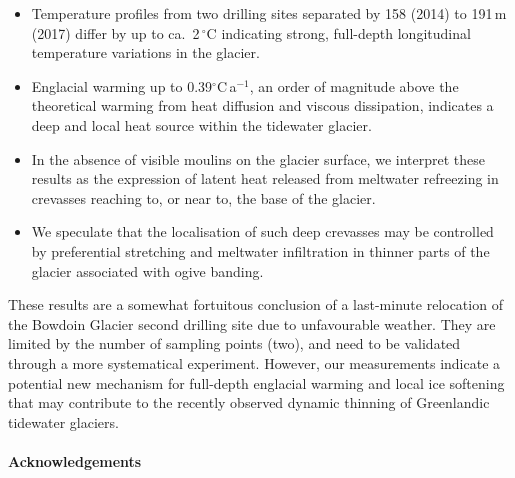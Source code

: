 \documentclass[utf8]{article}
\begin{document}
    \begin{itemize}

      \item Temperature profiles from two drilling sites separated by 158
        (2014) to 191\,m (2017) differ by up to ca.~2\,$^\circ$C indicating
        strong, full-depth longitudinal temperature variations in the glacier.

      \item Englacial warming up to 0.39$^\circ$C\,a$^{-1}$, an order of
        magnitude above the theoretical warming from heat diffusion and viscous
        dissipation, indicates a deep and local heat source within the
        tidewater glacier.

      \item In the absence of visible moulins on the glacier surface, we interpret
        these results as the expression of latent heat released from meltwater
        refreezing in crevasses reaching to, or near to, the base of the glacier.

      \item We speculate that the localisation of such deep crevasses may be
        controlled by preferential stretching and meltwater infiltration
        in thinner parts of the glacier associated with ogive banding.

    \end{itemize}

    These results are a somewhat fortuitous conclusion of a last-minute relocation
    of the Bowdoin Glacier second drilling site due to unfavourable weather.
    They are limited by the number of sampling points (two), and need to
    be validated through a more systematical experiment. However, our
    measurements indicate
    a potential new mechanism for full-depth englacial warming and local
    ice softening that may contribute to the recently observed dynamic
    thinning of Greenlandic tidewater glaciers.



\paragraph{Acknowledgements}
\end{document}
